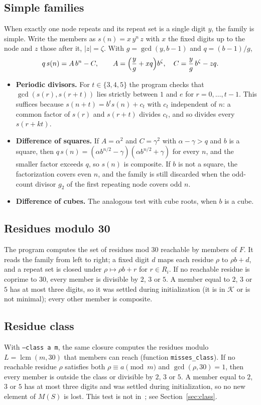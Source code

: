 \documentclass[11pt]{article}
\theoremstyle{definition}
\theoremstyle{remark}
\newcommand{\K}{\mathcal{K}}
\newcommand{\code}[1]{\texttt{#1}}
\begin{document}
\subsection{Simple families}
When exactly one node repeats and its repeat set is a single digit $y$, the family is simple. Write the members as $s(n)=x\,y^n\,z$ with $x$ the fixed digits up to the node and $z$ those after it, $|z|=\zeta$. With $g=\gcd(y,b-1)$ and $q=(b-1)/g$,
\[
  q\,s(n)=A\,b^n-C,\qquad A=\Bigl(\frac{y}{g}+xq\Bigr)b^{\zeta},\quad C=\frac{y}{g}\,b^{\zeta}-zq .
\]
\begin{itemize}
\item \textbf{Periodic divisors.} For $t\in\{3,4,5\}$ the program checks that $\gcd(s(r),s(r+t))$ lies strictly between $1$ and $e$ for $r=0,\dots,t-1$. This suffices because $s(n+t)=b^t s(n)+c_t$ with $c_t$ independent of $n$: a common factor of $s(r)$ and $s(r+t)$ divides $c_t$, and so divides every $s(r+kt)$.
\item \textbf{Difference of squares.} If $A=\alpha^2$ and $C=\gamma^2$ with $\alpha-\gamma>q$ and $b$ is a square, then $q\,s(n)=(\alpha b^{n/2}-\gamma)(\alpha b^{n/2}+\gamma)$ for every $n$, and the smaller factor exceeds $q$, so $s(n)$ is composite. If $b$ is not a square, the factorization covers even $n$, and the family is still discarded when the odd-count divisor $g_2$ of the first repeating node covers odd $n$.
\item \textbf{Difference of cubes.} The analogous test with cube roots, when $b$ is a cube.
\end{itemize}

\subsection{Residues modulo 30}
The program computes the set of residues mod $30$ reachable by members of $F$. It reads the family from left to right; a fixed digit $d$ maps each residue $\rho$ to $\rho b+d$, and a repeat set is closed under $\rho\mapsto\rho b+r$ for $r\in R_i$. If no reachable residue is coprime to $30$, every member is divisible by $2$, $3$ or $5$. A member equal to $2$, $3$ or $5$ has at most three digits, so it was settled during initialization (it is in $\K$ or is not minimal); every other member is composite.

\subsection{Residue class}
With \code{--class a m}, the same closure computes the residues modulo $L=\operatorname{lcm}(m,30)$ that members can reach (function \code{misses\_class}). If no reachable residue $\rho$ satisfies both $\rho\equiv a\pmod m$ and $\gcd(\rho,30)=1$, then every member is outside the class or divisible by $2$, $3$ or $5$. A member equal to $2$, $3$ or $5$ has at most three digits and was settled during initialization, so no new element of $M(S)$ is lost. This test is not in~\cite{BDS}; see Section~\ref{sec:class}.
\end{document}
